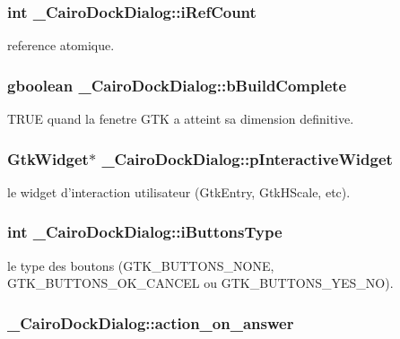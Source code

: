 \subsubsection{\setlength{\rightskip}{0pt plus 5cm}int {\bf \_\-CairoDockDialog::iRefCount}}\label{struct__CairoDockDialog_e512616f06d60adbda900b2776498266}


reference atomique. 

\subsubsection{\setlength{\rightskip}{0pt plus 5cm}gboolean {\bf \_\-CairoDockDialog::bBuildComplete}}\label{struct__CairoDockDialog_7e48a7f69a7659f3e5f80d92fd15dcfd}


TRUE quand la fenetre GTK a atteint sa dimension definitive. 

\subsubsection{\setlength{\rightskip}{0pt plus 5cm}GtkWidget$\ast$ {\bf \_\-CairoDockDialog::pInteractiveWidget}}\label{struct__CairoDockDialog_fd4044e9e69ad85b92a1b9dd56bd1a8e}


le widget d'interaction utilisateur (GtkEntry, GtkHScale, etc). 

\subsubsection{\setlength{\rightskip}{0pt plus 5cm}int {\bf \_\-CairoDockDialog::iButtonsType}}\label{struct__CairoDockDialog_74c115eb02745de3396eec6697ffc43b}


le type des boutons (GTK\_\-BUTTONS\_\-NONE, GTK\_\-BUTTONS\_\-OK\_\-CANCEL ou GTK\_\-BUTTONS\_\-YES\_\-NO). 

\subsubsection{ {\bf \_\-CairoDockDialog::action\_\-on\_\-answer}}\label{struct__CairoDockDialog_2c8d6c603a6694002a2a5154d76927bd}


